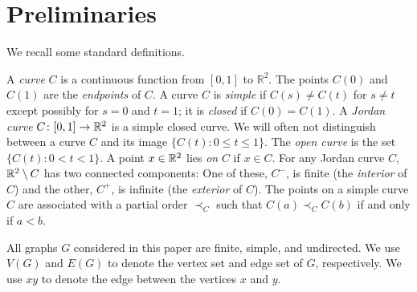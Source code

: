 \section{%
  Preliminaries}

We recall some %
standard definitions. %


%
A \emph{curve} $C$ is a continuous function from $[0,1]$
to $\mathbb{R}^2$.  The points $C(0)$ and $C(1)$ are the \emph{endpoints} of $C$.  A curve $C$ is \emph{simple} if $C(s)\neq C(t)$
for $s\ne t$ %
except possibly for $s=0$ and $t=1$; it is \emph{closed} if $C(0)=C(1)$.  A \emph{Jordan
	curve} $C\colon [0,1]\to\mathbb{R}^2$ is a simple closed curve.  
We will often not distinguish between a curve $C$ and its
image $\{C(t):0\le t\le 1\}$. %
The \emph{open curve} is the set $\{C(t):0< t< 1\}$.
%
A point $x\in\mathbb{R}^2$ lies \emph{on} $C$ if $x\in C$.  %
%
For any Jordan curve $C$, $\mathbb{R}^2\setminus C$ has two connected
components: One of these, $C^-$, is finite (the {\em interior} of $C$) and the other, $C^+$, is
infinite (the {\em exterior} of $C$).  
%
The points on a simple curve $C$ are associated with a partial order $\prec_C$ such that $C(a)\prec_C C(b)$ if and only if $a<b$.  


All graphs $G$ considered in this paper are finite, simple, and
undirected.   We use $V(G)$ and $E(G)$ to denote the vertex set and edge
set of $G$, respectively.
We use $xy$
to denote the edge between the vertices %
$x$ and $y$. %

